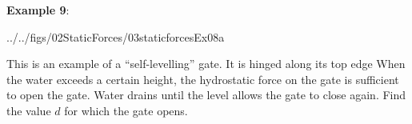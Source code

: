 \documentclass[10pt,onesided]{amsart}
\begin{document}
\begin{minipage}[t]{0.4\textwidth}
	\textbf{Example 9}:\\
	\begin{cfig}[0.75]{../../figs/02StaticForces/03staticforcesEx08a}\end{cfig}
	\raggedright
	This is an example of a ``self-levelling'' gate. It is hinged along its top edge \parb
	When the water exceeds a certain height, the hydrostatic force on the gate is sufficient to
	open the gate. Water drains until the level allows the gate to close again. \parb
	Find the value $d$ for which the gate opens.
\end{minipage}
\end{document}

